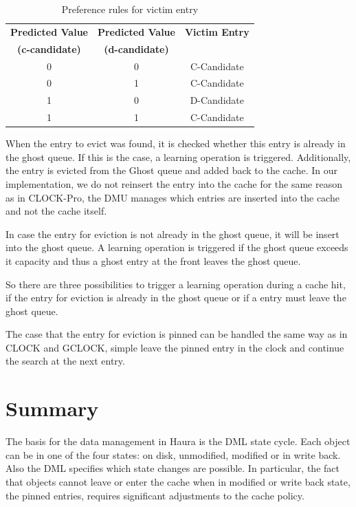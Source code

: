 \documentclass[
	12pt,
	a4paper,
	abstract,
	bibliography=totoc,
	chapterprefix,
	headings=openright,
	numbers=endperiod,
	parskip=half,
	twoside,
]{scrreprt}
\begin{document}
\begin{table}[ht]
	\centering
	\begin{tabular}{|c|c|c|}
		\hline
		\textbf{Predicted Value} & \textbf{Predicted Value} & \textbf{Victim Entry} \\
		\textbf{(c-candidate)} & \textbf{(d-candidate)} & \\
		\hline
		0 & 0 & C-Candidate \\
		\hline
		0 & 1 & C-Candidate \\
		\hline
		1 & 0 & D-Candidate \\
		\hline
		1 & 1 & C-Candidate \\
		\hline
	\end{tabular}
	\caption{Preference rules for victim entry \cite{cho2021ml}}
	\label{tab:ml-clock preference rules}
\end{table}


When the entry to evict was found,
it is checked whether this entry is already in the ghost queue.
If this is the case, a learning operation is triggered.
Additionally, the entry is evicted from the Ghost queue and added back to the cache.
In our implementation, we do not reinsert the entry into the cache for the same reason as in CLOCK-Pro, the DMU
manages which entries are inserted into the cache and not the cache itself.

In case the entry for eviction is not already in the ghost queue, it will be insert into the ghost queue.
A learning operation is triggered if the ghost queue exceeds it capacity and thus a ghost entry at the front leaves the ghost queue.

So there are three possibilities to trigger a learning operation during a cache hit, 
if the entry for eviction is already in the ghost queue or
if a entry must leave the ghost queue.

The case that the entry for eviction is pinned can be handled the same way as in CLOCK and GCLOCK, 
simple leave the pinned entry in the clock and continue the search at the next entry.


\section{Summary}
\label{sec:background summary}

The basis for the data management in Haura is the DML state cycle.
Each object can be in one of the four states: on disk, unmodified, modified or in write back.
Also the DML specifies which state changes are possible.
In particular, the fact that objects cannot leave or enter the cache when in modified or 
write back state, the pinned entries, requires significant adjustments to the cache policy.
\end{document}
